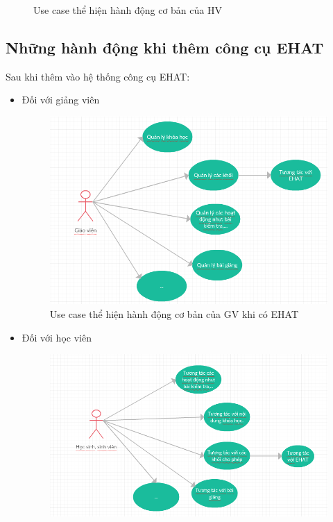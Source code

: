 \begin{itemize}
\begin{center}
\begin{figure}[htp]
\begin{center}
			\end{center}
			\caption{Use case \cite{usecase:1} thể hiện hành động cơ bản của HV}
			\label{refhinh11}
		\end{figure}
	\end{center}
\end{itemize}

\subsection{Những hành động khi thêm công cụ EHAT}
Sau khi thêm vào hệ thống công cụ EHAT:
\begin{itemize}
	\item Đối với giảng viên
	\begin{center}
		\begin{figure}[htp]
			\begin{center}
				\includegraphics[scale=0.65]{img/usecasegvehat}
			\end{center}
			\caption{Use case thể hiện hành động cơ bản của GV khi có EHAT}
			\label{refhinh12}
		\end{figure}
	\end{center}
	\vskip 3cm
	\item Đối với học viên
	\begin{center}
		\begin{figure}[htp]
			\begin{center}
				\includegraphics[scale=0.7]{img/usecasehsehat}

\end{center}
\end{figure}
\end{center}
\end{itemize}
